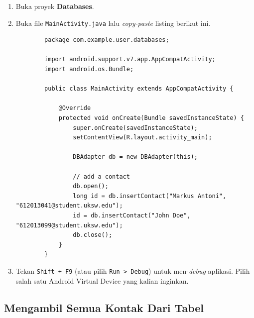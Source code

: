 \documentclass{scrartcl}
\begin{document}
	\begin{enumerate}
		\item Buka proyek \textbf{Databases}.
		\item Buka file \texttt{MainActivity.java} lalu \textit{copy-paste} listing berikut ini.
		
		\begin{verbatim}
		package com.example.user.databases;
		
		import android.support.v7.app.AppCompatActivity;
		import android.os.Bundle;
		
		public class MainActivity extends AppCompatActivity {
		
			@Override
			protected void onCreate(Bundle savedInstanceState) {
				super.onCreate(savedInstanceState);
				setContentView(R.layout.activity_main);
				
				DBAdapter db = new DBAdapter(this);
				
				// add a contact
				db.open();
				long id = db.insertContact("Markus Antoni", "612013041@student.uksw.edu");
				id = db.insertContact("John Doe", "612013099@student.uksw.edu");
				db.close();
			}
		}
		\end{verbatim}
		\item Tekan \texttt{Shift + F9} (atau pilih \texttt{Run > Debug}) untuk men-\textit{debug} aplikasi. Pilih salah satu Android Virtual Device yang kalian inginkan.
	\end{enumerate}

	\subsection{Mengambil Semua Kontak Dari Tabel}
	
\end{document}
